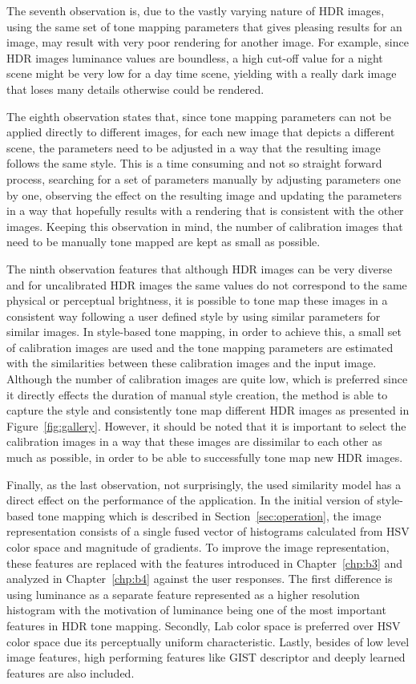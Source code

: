 The seventh observation is, due to the vastly varying nature of HDR images, using the same set of tone mapping parameters that gives pleasing results for an image, may result with very poor rendering for another image. For example, since HDR images luminance values are boundless, a high cut-off value for a night scene might be very low for a day time scene, yielding with a really dark image that loses many details otherwise could be rendered.

The eighth observation states that, since tone mapping parameters can not be applied directly to different images, for each new image that depicts a different scene, the parameters need to be adjusted in a way that the resulting image follows the same style. This is a time consuming and not so straight forward process, searching for a set of parameters manually by adjusting parameters one by one, observing the effect on the resulting image and updating the parameters in a way that hopefully results with a rendering that is consistent with the other images. Keeping this observation in mind, the number of calibration images that need to be manually tone mapped are kept as small as possible.

The ninth observation features that although HDR images can be very diverse and for uncalibrated HDR images the same values do not correspond to the same physical or perceptual brightness, it is possible to tone map these images in a consistent way following a user defined style by using similar parameters for similar images. In style-based tone mapping, in order to achieve this, a small set of calibration images are used and the tone mapping parameters are estimated with the similarities between these calibration images and the input image. Although the number of calibration images are quite low, which is preferred since it directly effects the duration of manual style creation, the method is able to capture the style and consistently tone map different HDR images as presented in Figure~\ref{fig:gallery}. However, it should be noted that it is important to select the calibration images in a way that these images are dissimilar to each other as much as possible, in order to be able to successfully tone map new HDR images.

Finally, as the last observation, not surprisingly, the used similarity model has a direct effect on the performance of the application. In the initial version of style-based tone mapping which is described in Section~\ref{sec:operation}, the image representation consists of a single fused vector of histograms calculated from HSV color space and magnitude of gradients. To improve the image representation, these features are replaced with the features introduced in Chapter~\ref{chp:b3} and analyzed in Chapter~\ref{chp:b4} against the user responses. The first difference is using luminance as a separate feature represented as a higher resolution histogram with the motivation of luminance being one of the most important features in HDR tone mapping. Secondly, Lab color space is preferred over HSV color space due its perceptually uniform characteristic. Lastly, besides of low level image features, high performing features like GIST descriptor and deeply learned features are also included.

